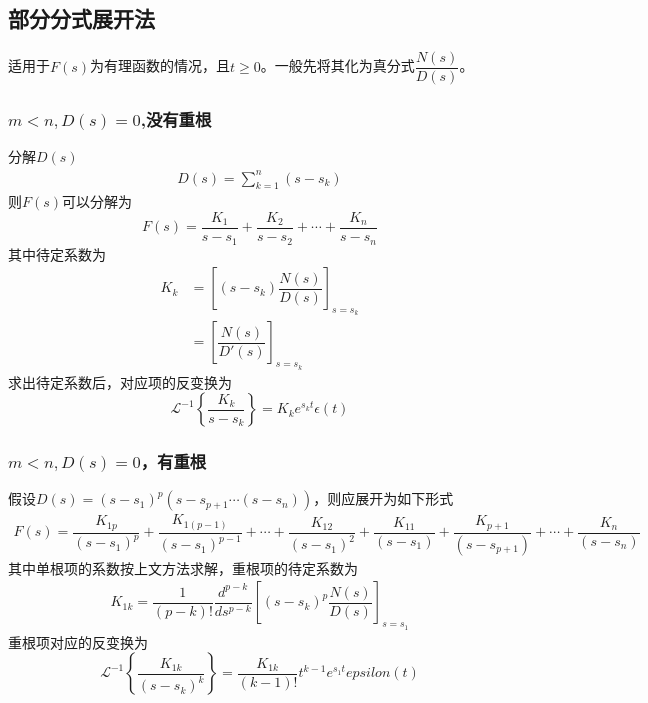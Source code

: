 \subsection{部分分式展开法}
适用于$F(s)$为有理函数的情况，且$t\geq 0$。一般先将其化为真分式$\dfrac{N(s)}{D(s)}$。
\subsubsection{$m<n,D(s)=0$,没有重根}
分解$D(s)$
\begin{align}
    D(s)=\sum_{k=1}^{n}(s-s_k)
\end{align}
则$F(s)$可以分解为
\begin{equation}
    F(s)=\dfrac{K_1}{s-s_1}+\dfrac{K_2}{s-s_2}+\cdots+\dfrac{K_n}{s-s_n}
\end{equation}
其中待定系数为
\begin{align}
    K_k&=\left[(s-s_k)\dfrac{N(s)}{D(s)}\right]_{s=s_k}\\
    &=\left[\dfrac{N(s)}{D'(s)}\right]_{s=s_k}
\end{align}
求出待定系数后，对应项的反变换为
\begin{equation}
    \mathcal{L}^{-1}\left\{ \dfrac{K_k}{s-s_k} \right\}=K_k e^{s_k t}\epsilon(t)
\end{equation}
\subsubsection{$m<n,D(s)=0$，有重根}
假设$D(s)=(s-s_1)^p(s-s_{p+1}\cdots (s-s_n))$，则应展开为如下形式
\begin{align}
    F(s)=\dfrac{K_{1p}}{(s-s_1)^p}+\dfrac{K_{1(p-1)}}{(s-s_1)^{p-1}}+\cdots+\dfrac{K_{12}}{(s-s_1)^2}+\dfrac{K_{11}}{(s-s_1)}+\dfrac{K_{p+1}}{(s-s_{p+1})}+\cdots+\dfrac{K_{n}}{(s-s_{n})} 
\end{align}
其中单根项的系数按上文方法求解，重根项的待定系数为
\begin{align}
    K_{1k}=\dfrac{1}{(p-k)!}\dfrac{d^{p-k}}{ds^{p-k}}\left[ (s-s_k)^p \dfrac{N(s)}{D(s)} \right]_{s=s_1}
\end{align}
重根项对应的反变换为
\begin{equation}
    \mathcal{L}^{-1}\left\{ \dfrac{K_{1k}}{(s-s_k)^k}\right\}=\dfrac{K_{1k}}{(k-1)!}t^{k-1}e^{s_1 t}epsilon(t) 
\end{equation}
